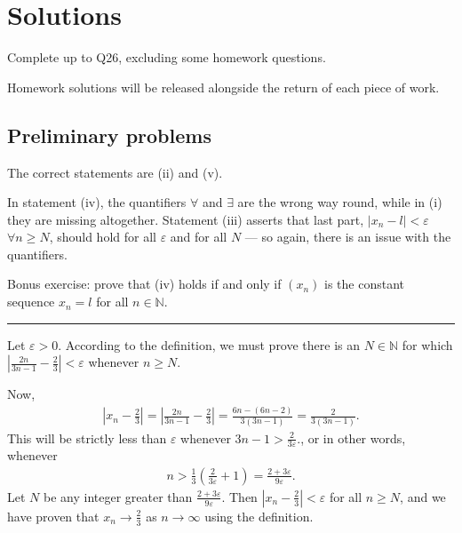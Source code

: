 \documentclass[letterpaper,10pt,english]{jupyterBook}
\begin{document}
\sphinxstepscope


\chapter{Solutions}
\label{\detokenize{Solutions-upto46:solutions}}\label{\detokenize{Solutions-upto46:sol}}\label{\detokenize{Solutions-upto46::doc}}
\sphinxAtStartPar
Complete up to Q26, excluding some homework questions.

\sphinxAtStartPar
Homework solutions will be released alongside the return of each piece of work.


\section{Preliminary problems}
\label{\detokenize{Solutions-upto46:preliminary-problems}}\label{\detokenize{Solutions-upto46:ch1sol}}
\sphinxAtStartPar
{\hyperref[\detokenize{Problems:p1}]{}}
The correct statements are (ii) and (v).

\sphinxAtStartPar
In statement (iv), the quantifiers \(\forall\) and \(\exists\) are the wrong way round, while in (i) they are missing altogether. Statement (iii) asserts that last part, \(|x_n-l|<\varepsilon\) \(\forall n\geq N\), should hold for all \(\varepsilon\) and for all \(N\) — so again, there is an issue with the quantifiers.

\sphinxAtStartPar
Bonus exercise: prove that (iv) holds if and only if \((x_n)\) is the constant sequence \(x_n=l\) for all \(n\in\mathbb{N}\).


\bigskip\hrule\bigskip

\label{\detokenize{Solutions-upto46:p2sol}}
\sphinxAtStartPar
{\hyperref[\detokenize{Problems:p2}]{}} 

\sphinxAtStartPar
Let \(\varepsilon>0\). According to the definition, we must prove there is an \(N\in\mathbb{N}\) for which \(\left|\frac{2n}{3n-1}-\frac{2}{3}\right|<\varepsilon\) whenever \(n\geq N\).

\sphinxAtStartPar
Now,
\begin{equation*}
\begin{split}
\left|x_n-\frac{2}{3}\right| = \left|\frac{2n}{3n-1}-\frac{2}{3}\right| = \frac{6n-(6n-2)}{3(3n-1)} = \frac{2}{3(3n-1)}.
\end{split}
\end{equation*}
\sphinxAtStartPar
This will be strictly less than \(\varepsilon\) whenever \(3n-1>\frac{2}{3\varepsilon}\)., or in other words, whenever
\begin{equation*}
\begin{split}
n>\frac{1}{3}\left(\frac{2}{3\varepsilon}+1\right)=\frac{2+3\varepsilon}{9\varepsilon}.
\end{split}
\end{equation*}
\sphinxAtStartPar
Let \(N\) be any integer greater than \(\frac{2+3\varepsilon}{9\varepsilon}\). Then \(\left|x_n-\frac{2}{3}\right|<\varepsilon\) for all \(n\geq N\), and we have proven that \(x_n\rightarrow\frac{2}{3}\) as \(n\rightarrow\infty\) using the definition.
\end{document}
